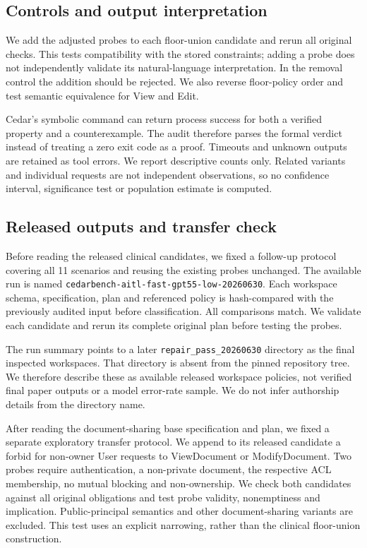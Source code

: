 \documentclass[sigconf,nonacm]{acmart}
\begin{document}
\subsection{Controls and output interpretation}
We add the adjusted probes to each floor-union candidate and rerun all original checks. This tests compatibility with the stored constraints; adding a probe does not independently validate its natural-language interpretation. In the removal control the addition should be rejected. We also reverse floor-policy order and test semantic equivalence for View and Edit.

Cedar's symbolic command can return process success for both a verified property and a counterexample. The audit therefore parses the formal verdict instead of treating a zero exit code as a proof. Timeouts and unknown outputs are retained as tool errors. We report descriptive counts only. Related variants and individual requests are not independent observations, so no confidence interval, significance test or population estimate is computed.

\subsection{Released outputs and transfer check}
Before reading the released clinical candidates, we fixed a follow-up protocol covering all 11 scenarios and reusing the existing probes unchanged. The available run is named \nolinkurl{cedarbench-aitl-fast-gpt55-low-20260630}. Each workspace schema, specification, plan and referenced policy is hash-compared with the previously audited input before classification. All comparisons match. We validate each candidate and rerun its complete original plan before testing the probes.

The run summary points to a later \texttt{repair\_pass\_20260630} directory as the final inspected workspaces. That directory is absent from the pinned repository tree. We therefore describe these as available released workspace policies, not verified final paper outputs or a model error-rate sample. We do not infer authorship details from the directory name.

After reading the document-sharing base specification and plan, we fixed a separate exploratory transfer protocol. We append to its released candidate a forbid for non-owner User requests to ViewDocument or ModifyDocument. Two probes require authentication, a non-private document, the respective ACL membership, no mutual blocking and non-ownership. We check both candidates against all original obligations and test probe validity, nonemptiness and implication. Public-principal semantics and other document-sharing variants are excluded. This test uses an explicit narrowing, rather than the clinical floor-union construction.
\end{document}
